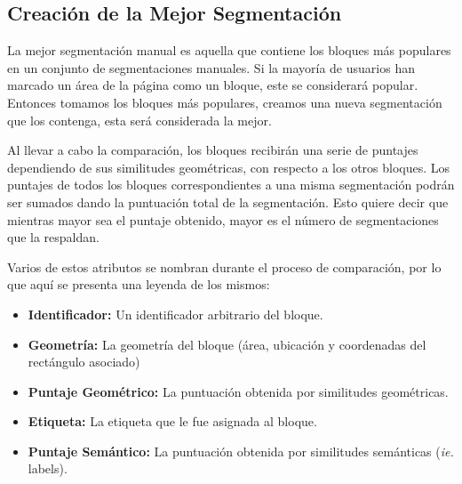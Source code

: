 \documentclass[10pt]{revecom}
\begin{document}
\subsection{Creación de la Mejor Segmentación}

La mejor segmentación manual es aquella que contiene los bloques más populares en un conjunto de segmentaciones manuales.
Si la mayoría de usuarios han marcado un área de la página como un bloque, este se considerará popular.
Entonces tomamos los bloques más populares, creamos una nueva segmentación que los contenga, esta será considerada la mejor.

Al llevar a cabo la comparación, los bloques recibirán una serie de puntajes dependiendo de sus similitudes geométricas, con respecto a los otros bloques. 
Los puntajes de todos los bloques correspondientes a una misma segmentación podrán ser sumados dando la puntuación total de la segmentación. 
Esto quiere decir que mientras mayor sea el puntaje obtenido, mayor es el número de segmentaciones que la respaldan. 

Varios de estos atributos se nombran durante el proceso de comparación, por lo que aquí se presenta una leyenda de los mismos:
\begin{itemize}
\item \textbf{Identificador:} Un identificador arbitrario del bloque. 
\item \textbf{Geometría:} La geometría del bloque (área, ubicación y coordenadas del rectángulo asociado)
\item \textbf{Puntaje Geométrico:} La puntuación obtenida por similitudes geométricas. 
\item \textbf{Etiqueta:} La etiqueta que le fue asignada al bloque. 
\item \textbf{Puntaje Semántico:} La puntuación obtenida por similitudes semánticas (\emph{ie.} labels). 
\end{itemize}
\end{document}
